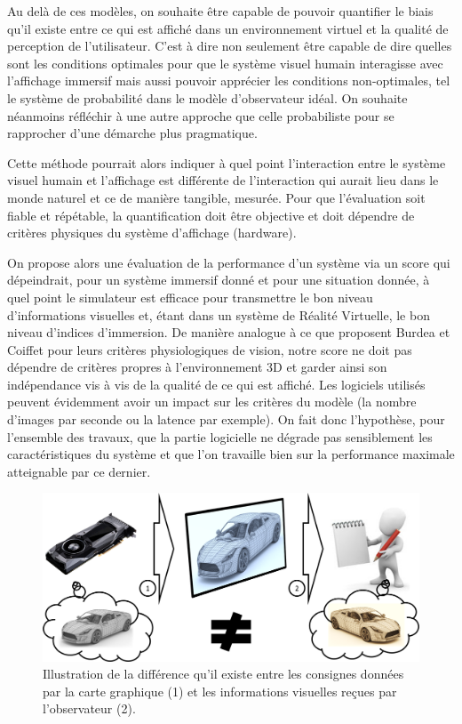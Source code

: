 	\par Au delà de ces modèles, on souhaite être capable de pouvoir quantifier le biais qu'il existe entre ce qui est affiché dans un environnement virtuel et la qualité de perception de l'utilisateur. C'est à dire non seulement être capable de dire quelles sont les conditions optimales pour que le système visuel humain interagisse avec l'affichage immersif mais aussi pouvoir apprécier les conditions non-optimales, tel le système de probabilité dans le modèle d'observateur idéal. On souhaite néanmoins réfléchir à une autre approche que celle probabiliste pour se rapprocher d'une démarche plus pragmatique.
	
	\par Cette méthode pourrait alors indiquer à quel point l'interaction entre le système visuel humain et l'affichage est différente de l'interaction qui aurait lieu dans le monde naturel et ce de manière tangible, mesurée. Pour que l'évaluation soit fiable et répétable, la quantification doit être objective et doit dépendre de critères physiques du système d'affichage (hardware).
	
	\par On propose alors une évaluation de la performance d'un système via un score qui dépeindrait, pour un système immersif donné et pour une situation donnée, à quel point le simulateur est efficace pour transmettre le bon niveau d'informations visuelles et, étant dans un système de Réalité Virtuelle, le bon niveau d'indices d'immersion. De manière analogue à ce que proposent Burdea et Coiffet pour leurs critères physiologiques de vision, notre score ne doit pas dépendre de critères propres à l'environnement 3D et garder ainsi son indépendance vis à vis de la qualité de ce qui est affiché. Les logiciels utilisés peuvent évidemment avoir un impact sur les critères du modèle (la nombre d'images par seconde ou la latence par exemple). On fait donc l'hypothèse, pour l'ensemble des travaux, que la partie logicielle ne dégrade pas sensiblement les caractéristiques du système et que l'on travaille bien sur la performance maximale atteignable par ce dernier.
	
	\begin{figure}[h]
		\centering
		\includegraphics[scale=.45]{Figures/ImageBias}
		\caption{Illustration de la différence qu'il existe entre les consignes données par la carte graphique (1) et les informations visuelles reçues par l'observateur (2).}
		\label{fig:image_bias}
	\end{figure}
			
